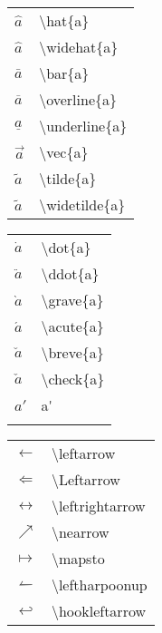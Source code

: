 \documentclass[14pt,a4paper]{extarticle}
\begin{document}
\begin{table}
  \begin{subtable}{.24\textwidth}
    \begin{tabular}{ p{1em} p{9em}  }

      $\hat{a}$ & \textbackslash hat\{a\} \\
      $\widehat{a}$ & \textbackslash widehat\{a\} \\
      $\bar{a}$ & \textbackslash bar\{a\} \\
      $\overline{a}$ & \textbackslash overline\{a\} \\
      $\underline{a}$ & \textbackslash underline\{a\} \\
      $\vec{a}$ & \textbackslash vec\{a\} \\
      $\tilde{a}$ & \textbackslash tilde\{a\} \\
      $\widetilde{a}$ & \textbackslash widetilde\{a\} \\


    \end{tabular}
  \end{subtable}
  \begin{subtable}{.24\textwidth}
    \begin{tabular}{ p{1em} p{9em}  }
      $\dot{a}$ & \textbackslash dot\{a\} \\
      $\ddot{a}$ & \textbackslash ddot\{a\} \\
      $\grave{a}$ & \textbackslash grave\{a\} \\
      $\acute{a}$ & \textbackslash acute\{a\} \\
      $\breve{a}$ & \textbackslash breve\{a\} \\
      $\check{a}$ & \textbackslash check\{a\} \\
      $a'$ & a\'{} \\

\\

    \end{tabular}
  \end{subtable}
  \begin{subtable}{.24\textwidth}
    \begin{tabular}{ p{1em} p{9em}  }
    
      $\leftarrow$ & \textbackslash leftarrow \\
      $\Leftarrow$ & \textbackslash Leftarrow \\
      $\leftrightarrow$ & \textbackslash leftrightarrow \\
      $\nearrow$ & \textbackslash nearrow \\
      $\mapsto$ & \textbackslash mapsto \\
      $\leftharpoonup$ & \textbackslash leftharpoonup \\
      $\hookleftarrow$ & \textbackslash hookleftarrow \\


\end{tabular}
\end{subtable}
\end{table}
\end{document}
